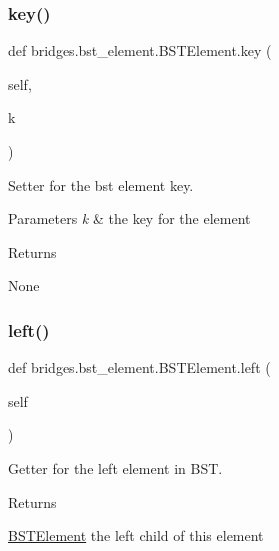 \subsubsection{\texorpdfstring{key()}{key()}\hspace{0.1cm}{\footnotesize\ttfamily [2/2]}}
{\footnotesize\ttfamily def bridges.\+bst\+\_\+element.\+B\+S\+T\+Element.\+key (\begin{DoxyParamCaption}\item[{}]{self,  }\item[{}]{k }\end{DoxyParamCaption})}



Setter for the bst element key. 


\begin{DoxyParams}{Parameters}
{\em k} & the key for the element \\
\hline
\end{DoxyParams}
\begin{DoxyReturn}{Returns}


None 
\end{DoxyReturn}
\mbox{\label{classbridges_1_1bst__element_1_1_b_s_t_element_adb40ae0f98fe1cb7f153494c544d3f9f}} 
\subsubsection{\texorpdfstring{left()}{left()}\hspace{0.1cm}{\footnotesize\ttfamily [1/2]}}
{\footnotesize\ttfamily def bridges.\+bst\+\_\+element.\+B\+S\+T\+Element.\+left (\begin{DoxyParamCaption}\item[{}]{self }\end{DoxyParamCaption})}



Getter for the left element in B\+ST. 

\begin{DoxyReturn}{Returns}


\hyperlink{classbridges_1_1bst__element_1_1_b_s_t_element}{B\+S\+T\+Element} the left child of this element 
\end{DoxyReturn}
\mbox{\label{classbridges_1_1bst__element_1_1_b_s_t_element_a0b45e63b73faabb6b969dd6222e07942}} 

